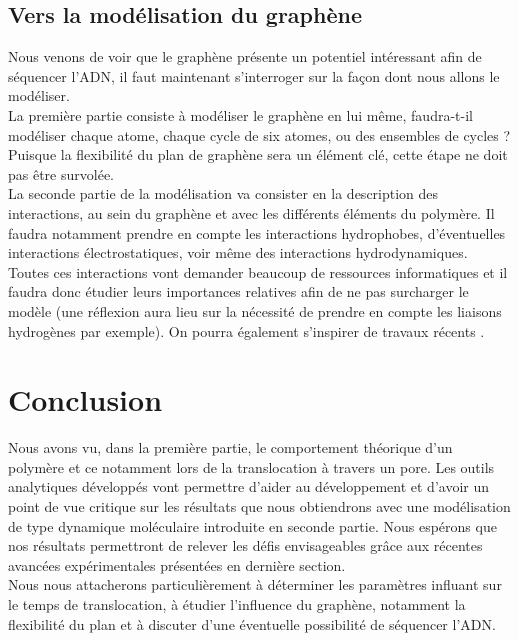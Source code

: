\documentclass[a4paper,11pt]{article}
\begin{document}
\subsection{Vers la modélisation du graphène}

Nous venons de voir que le graphène présente un potentiel intéressant afin de séquencer l'ADN, il faut maintenant s'interroger sur la façon dont nous allons le modéliser.\\

La première partie consiste à modéliser le graphène en lui même, faudra-t-il modéliser chaque atome, chaque cycle de six atomes, ou des ensembles de cycles ? Puisque la flexibilité du plan de graphène sera un élément clé, cette étape ne doit pas être survolée.\\

La seconde partie de la modélisation va consister en la description des interactions, au sein du graphène et avec les différents éléments du polymère. Il faudra notamment prendre en compte les interactions hydrophobes, d'éventuelles interactions électrostatiques, voir même des interactions hydrodynamiques. Toutes ces interactions vont demander beaucoup de ressources informatiques et il faudra donc étudier leurs importances relatives afin de ne pas surcharger le modèle (une réflexion aura lieu sur la nécessité de prendre en compte les liaisons hydrogènes par exemple). On pourra également s'inspirer de travaux récents \cite{doublebrin}.

\section{Conclusion}

Nous avons vu, dans la première partie, le comportement théorique d'un polymère et ce notamment lors de la translocation à travers un pore. Les outils analytiques développés vont permettre d'aider au développement et d'avoir un point de vue critique sur les résultats que nous obtiendrons avec une modélisation de type dynamique moléculaire introduite en seconde partie. Nous espérons que nos résultats permettront de relever les défis envisageables grâce aux récentes avancées expérimentales présentées en dernière section.\\

Nous nous attacherons particulièrement à déterminer les paramètres influant sur le temps de translocation, à étudier l'influence du graphène, notamment la flexibilité du plan et à discuter d'une éventuelle possibilité de séquencer l'ADN.






\end{document}
